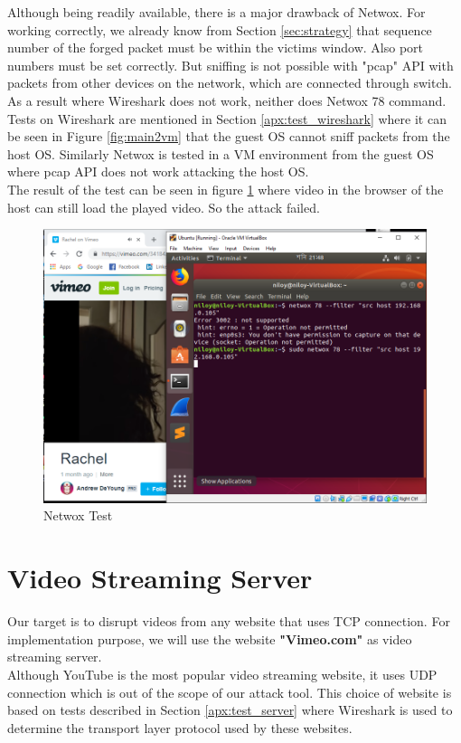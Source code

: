 \documentclass[14pt]{extarticle}
\begin{document}
    
    
    Although being readily available, there is a major drawback of Netwox. For working correctly, we already know from Section \ref{sec:strategy} that sequence number of the forged packet must be within the victims window. Also port numbers must be set correctly. But sniffing is not possible with "pcap" API with packets from other devices on the network, which are connected through switch. As a result where Wireshark does not work, neither does Netwox 78 command. \\ 
    Tests on Wireshark are mentioned in Section \ref{apx:test_wireshark} where it can be seen in Figure \ref{fig:main2vm} that the guest OS cannot sniff packets from the host OS. Similarly Netwox is tested in a VM environment from the guest OS where pcap API does not work attacking the host OS. \\
    The result of the test can be seen in figure \ref{fig:netwox_test} where video in the browser of the host can still load the played video. So the attack failed.
    
    \begin{figure}
    	\centering
    	\includegraphics[width=.95\textwidth]{Pictures/Netwox_test.png}
    	\caption{Netwox Test} 
    	\label{fig:netwox_test}
    \end{figure}
    

\section{Video Streaming Server}
    Our target is to disrupt videos from any website that uses TCP connection. For implementation purpose, we will use the website \textbf{"Vimeo.com"} as video streaming server. \\
    Although YouTube is the most popular video streaming website, it uses UDP connection which is out of the scope of our attack tool. This choice of website is based on tests described in Section \ref{apx:test_server} where Wireshark is used to determine the transport layer protocol used by these websites.    
\end{document}

